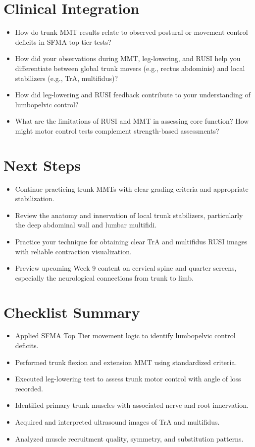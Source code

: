 \section*{Clinical Integration}

\begin{itemize}
  \item How do trunk MMT results relate to observed postural or movement control deficits in SFMA top tier tests?
 \item How did your observations during MMT, leg-lowering, and RUSI help you differentiate between global trunk movers (e.g., rectus abdominis) and local stabilizers (e.g., TrA, multifidus)?
  \item How did leg-lowering and RUSI feedback contribute to your understanding of lumbopelvic control?
  \item What are the limitations of RUSI and MMT in assessing core function? How might motor control tests complement strength-based assessments?
\end{itemize}

\section*{Next Steps}

\begin{itemize}
  \item Continue practicing trunk MMTs with clear grading criteria and appropriate stabilization.
  \item Review the anatomy and innervation of local trunk stabilizers, particularly the deep abdominal wall and lumbar multifidi.
  \item Practice your technique for obtaining clear TrA and multifidus RUSI images with reliable contraction visualization.
  \item Preview upcoming Week 9 content on cervical spine and quarter screens, especially the neurological connections from trunk to limb.
\end{itemize}

\section*{Checklist Summary}
\begin{itemize}
  \item [$\square$] Applied SFMA Top Tier movement logic to identify lumbopelvic control deficits.
  \item [$\square$] Performed trunk flexion and extension MMT using standardized criteria.
  \item [$\square$] Executed leg-lowering test to assess trunk motor control with angle of loss recorded.
  \item [$\square$] Identified primary trunk muscles with associated nerve and root innervation.
  \item [$\square$] Acquired and interpreted ultrasound images of TrA and multifidus.
  \item [$\square$] Analyzed muscle recruitment quality, symmetry, and substitution patterns.
\end{itemize}